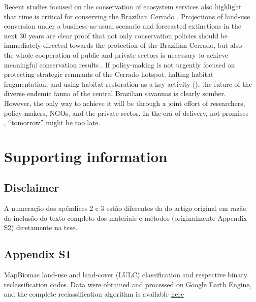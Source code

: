 \documentclass[12pt,openright,oneside,a4paper,english]{abntex2}
\begin{document}
Recent studies focused on the conservation of ecosystem services also highlight that time is critical for conserving the Brazilian Cerrado \citep{Resende2019}. Projections of land-use conversion under a business-as-usual scenario and forecasted extinctions in the next 30 years are clear proof that not only conservation policies should be immediately directed towards the protection of the Brazilian Cerrado, but also the whole cooperation of public and private sectors is necessary to achieve meaningful conservation results \citep{Strassburg2017}. If policy-making is not urgently focused on protecting strategic remnants of the Cerrado hotspot, halting habitat fragmentation, and using habitat restoration as a key activity (\citealp[see][]{Strassburg2017}), the future of the diverse endemic fauna of the central Brazilian savannas is clearly somber. However, the only way to achieve it will be through a joint effort of researchers, policy-makers, NGOs, and the private sector. In the era of delivery, not promises \citep{Loyola2022}, “tomorrow” might be too late.

\pagebreak

\section{Supporting information}\label{sec:supinfo-3}
\subsection*{Disclaimer}

A numeração dos apêndices 2 e 3 estão diferentes da do artigo original \citep{VieiraAlencar2023} em razão da inclusão do texto completo dos materiais e métodos (originalmente Appendix S2) diretamente na tese.

\subsection*{Appendix S1}\label{sup:3-s1}

\noindent
MapBiomas land-use and land-cover (LULC) classification and respective binary reclassification codes. Data were obtained and processed on Google Earth Engine, and the complete reclassification algorithm is available \href{https://code.earthengine.google.com/?scriptPath=users%2Fjoaosvalencar%2FJP%3APriority_Areas_2022}{here}
\end{document}
